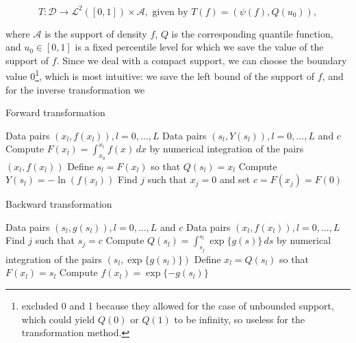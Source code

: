 \begin{equation}
    T : \mathcal{D} \to \mathcal{L}^2([0,1]) \times \mathcal{A}, \text{ given by } T(f) = (\psi(f), Q(u_0)),
\end{equation}

where $\mathcal{A}$ is the support of density $f$, $Q$ is the corresponding quantile function,
and $u_0 \in [0,1]$ is a fixed percentile level for which we save the value of the support
of $f$. Since we deal with a compact support, we can choose the boundary value
0\footnote{\textcite{KokoszkaEtAl2019} excluded 0 and 1 because they allowed for the case
of unbounded support, which could yield $Q(0)$ or $Q(1)$ to be infinity, so useless for
the transformation method.}, which is most intuitive: we save the left bound of the
support of $f$, and for the inverse transformation we 

\begin{algorithm}
    \caption{Forward transformation}
    \label{alg:forward}
    \begin{algorithmic}[1]
    \Require Data pairs \( (x_l, f(x_l)), l = 0, \ldots, L \)
    \Ensure Data pairs \( (s_l, Y(s_l)), l = 0, \ldots, L \) and \( c \)
        \State Compute \( F(x_l) = \int_{x_0}^{x_l} f(x) \, dx \) by numerical integration of the pairs \( (x_l, f(x_l)) \)
        \State Define \( s_l = F(x_l) \) so that \( Q(s_l) = x_l \)
        \State Compute \( Y(s_l) = -\ln(f(x_l)) \)
        \State Find \( j \) such that \( x_j = 0 \) and set \( c = F(x_j) = F(0) \)
    \EndFor
    \end{algorithmic}
\end{algorithm}
    
\begin{algorithm}
    \caption{Backward transformation}
    \label{alg:backward}
    \begin{algorithmic}[1]
    \Require Data pairs \( (s_l, g(s_l)), l = 0, \ldots, L \) and \( c \)
    \Ensure Data pairs \( (x_l, f(x_l)), l = 0, \ldots, L \)
        \State Find \( j \) such that \( s_j = c \)
        \State Compute \( Q(s_l) = \int_{s_j}^{s_l} \exp\{g(s)\} \, ds \) by numerical integration of the pairs \( (s_l, \exp\{g(s_l)\}) \)
        \State Define \( x_l = Q(s_l) \) so that \( F(x_l) = s_l \)
        \State Compute \( f(x_l) = \exp \{-g(s_l)\} \)
    \EndFor
    \end{algorithmic}
\end{algorithm}
    



